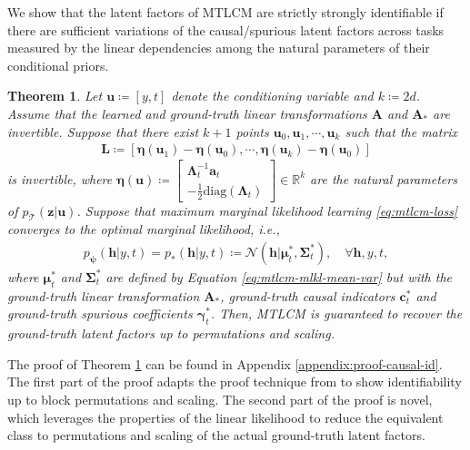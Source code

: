 \documentclass{article} %
\theoremstyle{plain}
\newtheorem{theorem}{Theorem}[section]
\theoremstyle{definition}
\theoremstyle{remark}
\begin{document}
We show that the latent factors of MTLCM are  strictly strongly identifiable if there are sufficient variations of the causal/spurious latent factors across tasks measured by the linear dependencies among the natural parameters of their conditional priors.

\begin{theorem}\label{thm:strong-id}
    Let $\mathbf{u}\coloneqq[y,t]$ denote the conditioning variable and $k\coloneqq2d$. Assume that the learned and ground-truth linear transformations $\mathbf{A}$ and $\mathbf{A}_{*}$ are invertible. Suppose that there exist $k+1$ points $\mathbf{u}_0, \mathbf{u}_1,\cdots,\mathbf{u}_{k}$ such that the matrix
    \begin{align}
        \mathbf{L}\coloneqq[\boldsymbol{\eta}(\mathbf{u}_1)-\boldsymbol{\eta}(\mathbf{u}_0),\cdots,\boldsymbol{\eta}(\mathbf{u}_{k})-\boldsymbol{\eta}(\mathbf{u}_0)]
    \end{align}
    is invertible, where $\boldsymbol{\eta}(\mathbf{u})\coloneqq\left[\begin{smallmatrix}\boldsymbol{\Lambda}_t^{-1}\mathbf{a}_t \\ -\frac{1}{2}\text{diag}(\boldsymbol{\Lambda}_t)\end{smallmatrix}\right]\in\mathbb{R}^{k}$ are the natural parameters of $p_{\mathcal{T}}(\mathbf{z}|\mathbf{u})$. Suppose that maximum marginal likelihood learning \eqref{eq:mtlcm-loss} converges to the optimal marginal likelihood, i.e.,
    \begin{align}
        p_{\boldsymbol{\psi}}(\mathbf{h}|y,t)=p_{*}(\mathbf{h}|y,t)\coloneqq\mathcal{N}(\mathbf{h}|\boldsymbol{\mu}_t^*,\boldsymbol{\Sigma}_t^*),\quad\forall\mathbf{h},y,t,
    \end{align}
    where $\boldsymbol{\mu}_t^*$ and $\boldsymbol{\Sigma}_t^*$ are defined by Equation \eqref{eq:mtlcm-mlkl-mean-var} but with the ground-truth linear transformation $\mathbf{A}_*$, ground-truth causal indicators $\mathbf{c}_t^*$ and ground-truth spurious coefficients $\boldsymbol{\gamma}_t^*$. Then, MTLCM is guaranteed to recover the ground-truth latent factors up to permutations and scaling.
\end{theorem}
The proof of Theorem \ref{thm:strong-id} can be found in Appendix \ref{appendix:proof-causal-id}. The first part of the proof adapts the proof technique from \citet{Khemakhem_Kingma_Monti_Hyvarinen_2020} to show identifiability up to block permutations and scaling. The second part of the proof is novel, which leverages the properties of the linear likelihood to reduce the equivalent class to permutations and scaling of the actual ground-truth latent factors.
\end{document}
